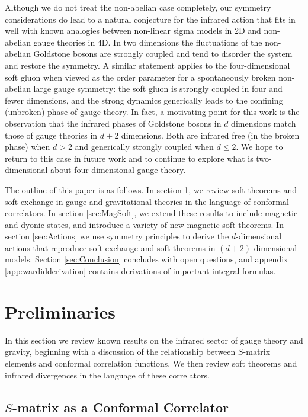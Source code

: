 \documentclass[11pt]{article}
\begin{document}
Although we do not treat the non-abelian case completely, our symmetry considerations do lead to a natural conjecture for the infrared action that fits in well with known analogies between non-linear sigma models in 2D and non-abelian gauge theories in 4D. In two dimensions the fluctuations of the non-abelian Goldstone bosons are strongly coupled and tend to disorder the system and restore the symmetry. A similar statement applies to the four-dimensional soft gluon when viewed as the order parameter for a spontaneously broken non-abelian large gauge symmetry: the soft gluon is strongly coupled in four and fewer dimensions, and the strong dynamics generically leads to the confining (unbroken) phase of gauge theory. In fact, a motivating point for this work is the observation that the infrared phases of Goldstone bosons in $d$ dimensions match those of gauge theories in $d+2$ dimensions. Both are infrared free (in the broken phase) when $d>2$ and generically strongly coupled when $d\leq2$. We hope to return to this case in future work and to continue to explore what is two-dimensional about four-dimensional gauge theory.

The outline of this paper is as follows. In section \ref{sec:Prelim}, we review soft theorems and soft exchange in gauge and gravitational theories in the language of conformal correlators. In section \ref{sec:MagSoft}, we extend these results to include magnetic and dyonic states, and introduce a variety of new magnetic soft theorems. In section \ref{sec:Actions} we use symmetry principles to derive the $d$-dimensional actions that reproduce soft exchange and soft theorems in $(d+2)$-dimensional models. Section \ref{sec:Conclusion} concludes with open questions, and appendix \ref{app:wardidderivation} contains derivations of important integral formulas. 




\section{Preliminaries} \label{sec:Prelim}

In this section we review known results on the infrared sector of gauge theory and gravity, beginning with a discussion of the relationship between $S$-matrix elements and conformal correlation functions. We then review soft theorems and infrared divergences in the language of these correlators.

\subsection{$S$-matrix as a Conformal Correlator}
\end{document}
